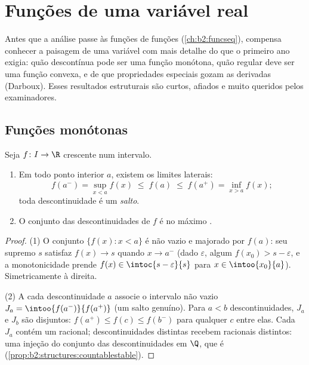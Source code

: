 \chapter{Funções de uma variável real}\label{ch:b2:realfun}

Antes que a análise passe às funções de funções (\cref{ch:b2:funcseq}),
compensa conhecer a paisagem de uma variável com mais detalhe do que
o primeiro ano exigia: quão descontínua pode ser uma função monótona, quão
regular deve ser uma função convexa, e de que propriedades especiais gozam
as derivadas (Darboux). Esses resultados estruturais são curtos,
afiados e muito queridos pelos examinadores.

\section{Funções monótonas}

\begin{theorem}\label{thm:b2:realfun:monotone}
Seja $f \colon I \to \R$ crescente num intervalo.
\begin{enumerate}
  \item Em todo ponto interior $a$, existem os limites laterais:
        \[
        f(a^-) = \sup_{x < a} f(x) \;\leq\; f(a) \;\leq\;
        f(a^+) = \inf_{x > a} f(x) ;
        \]
        toda descontinuidade é um \emph{salto}.
  \item O conjunto das descontinuidades de $f$ é no máximo
        .
\end{enumerate}
\end{theorem}

\begin{proof}
(1) O conjunto $\{f(x) : x < a\}$ é não vazio e majorado por $f(a)$:
seu supremo $s$ satisfaz $f(x) \to s$ quando $x \to a^-$ (dado
$\varepsilon$, algum $f(x_0) > s - \varepsilon$, e a monotonicidade
prende $f(x) \in \intoc{s - \varepsilon}{s}$ para $x \in
\intoo{x_0}{a}$). Simetricamente à direita.

(2) A cada descontinuidade $a$ associe o intervalo  não vazio
$J_a = \intoo{f(a^-)}{f(a^+)}$ (um salto genuíno). Para $a < b$
descontinuidades, $J_a$ e $J_b$ são disjuntos: $f(a^+) \leq f(c)
\leq f(b^-)$ para qualquer $c$ entre elas. Cada $J_a$ contém um racional;
descontinuidades distintas recebem racionais distintos: uma injeção do
conjunto das descontinuidades em $\Q$, que é 
(\cref{prop:b2:structures:countablestable}).
\end{proof}

